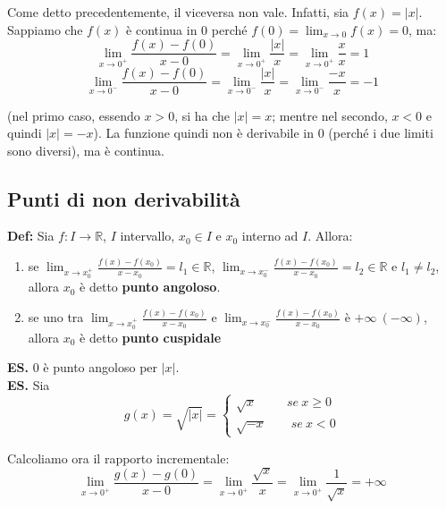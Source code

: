\documentclass{article}
\begin{document}
\noindent Come detto precedentemente, il viceversa non vale. Infatti, sia $f(x) = |x|$. Sappiamo che $f(x)$ è continua in $0$ perché $f(0) = \lim_{x \to 0} f(x) = 0$, ma:
\begin{equation*}
    \lim_{x \to 0^+} \frac{f(x) - f(0)}{x - 0} = \lim_{x \to 0^+} \frac{|x|}{x} = \lim_{x \to 0^+} \frac{x}{x} = 1
\end{equation*}
\begin{equation*}
    \lim_{x \to 0^-} \frac{f(x) - f(0)}{x - 0} = \lim_{x \to 0^-} \frac{|x|}{x} = \lim_{x \to 0^-} \frac{-x}{x} = -1
\end{equation*}

\noindent (nel primo caso, essendo $x > 0$, si ha che $|x| = x$; mentre nel secondo, $x < 0$ e quindi $|x| = -x$). La funzione quindi non è derivabile in $0$ (perché i due limiti sono diversi), ma è continua.

\subsection{Punti di non derivabilità}
\textbf{Def:} Sia $f: I \xrightarrow{} \mathbb{R}$, $I$ intervallo, $x_0 \in I$ e $x_0$ interno ad $I$. Allora:
\begin{enumerate}
    \item se $\lim_{x \to x_0^+} \frac{f(x) - f(x_0)}{x - x_0} = l_1 \in \mathbb{R}$, $\lim_{x \to x_0^-} \frac{f(x) - f(x_0)}{x - x_0} = l_2 \in \mathbb{R}$ e $l_1 \neq l_2$, allora $x_0$ è detto \textbf{punto angoloso}.
    \item se uno tra $\lim_{x \to x_0^+} \frac{f(x) - f(x_0)}{x - x_0}$ e $\lim_{x \to x_0^-} \frac{f(x) - f(x_0)}{x - x_0}$ è $+\infty \ (-\infty)$, allora $x_0$ è detto \textbf{punto cuspidale}
\end{enumerate}

\noindent\textbf{ES.} $0$ è punto angoloso per $|x|$.\\

\noindent\textbf{ES.} Sia 
\begin{equation*}
    g(x) = \sqrt{|x|} = \begin{cases}
        \sqrt{x} \qquad \ \ se \ x \geq 0\\
        \sqrt{-x} \qquad se \ x < 0
    \end{cases}
\end{equation*}

\noindent Calcoliamo ora il rapporto incrementale:
\begin{equation*}
    \lim_{x \to 0^+} \frac{g(x) - g(0)}{x - 0} = \lim_{x \to 0^+} \frac{\sqrt{x}}{x} = \lim_{x \to 0^+} \frac{1}{\sqrt{x}} = +\infty
\end{equation*}
\end{document}
